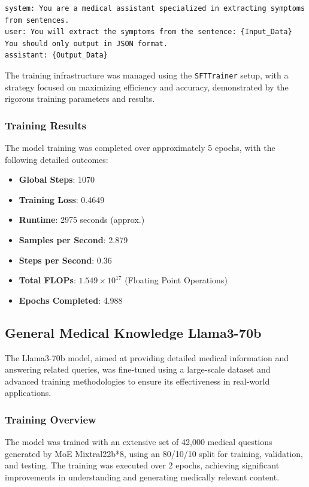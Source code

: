 \begin{verbatim}
system: You are a medical assistant specialized in extracting symptoms from sentences.
user: You will extract the symptoms from the sentence: {Input_Data}
You should only output in JSON format.
assistant: {Output_Data}
\end{verbatim}

The training infrastructure was managed using the \texttt{SFTTrainer} setup, with a strategy focused on maximizing efficiency and accuracy, demonstrated by the rigorous training parameters and results.

\subsubsection{Training Results}
The model training was completed over approximately 5 epochs, with the following detailed outcomes:

\begin{itemize}
    \item \textbf{Global Steps}: 1070
    \item \textbf{Training Loss}: 0.4649
    \item \textbf{Runtime}: 2975 seconds (approx.)
    \item \textbf{Samples per Second}: 2.879
    \item \textbf{Steps per Second}: 0.36
    \item \textbf{Total FLOPs}: \(1.549 \times 10^{17}\) (Floating Point Operations)
    \item \textbf{Epochs Completed}: 4.988
\end{itemize}

\subsection{General Medical Knowledge Llama3-70b}

The Llama3-70b model, aimed at providing detailed medical information and answering related queries, was fine-tuned using a large-scale dataset and advanced training methodologies to ensure its effectiveness in real-world applications.

\subsubsection{Training Overview}
The model was trained with an extensive set of 42,000 medical questions generated by MoE Mixtral22b*8, using an 80/10/10 split for training, validation, and testing. The training was executed over 2 epochs, achieving significant improvements in understanding and generating medically relevant content.


